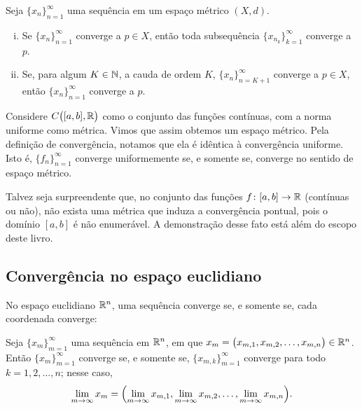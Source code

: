 \begin{prop} \label{prop:mssubseq}
Seja $\{ x_n \}_{n=1}^\infty$ uma sequência em um espaço métrico $(X,d)$.
\begin{enumerate}[(i)]
\item Se $\{ x_n \}_{n=1}^\infty$ converge a $p \in X$, então toda
subsequência $\{ x_{n_k} \}_{k=1}^\infty$
converge a $p$.
\item Se, para algum $K \in {\mathbb{N}}$, a cauda de ordem $K$,
$\{ x_n \}_{n=K+1}^\infty$
converge a $p \in X$, então
 $\{ x_n \}_{n=1}^\infty$ converge a $p$.
\end{enumerate}
\end{prop}

\begin{example}
Considere $C\bigl([a,b],{\mathbb{R}}\bigr)$ como o conjunto das funções contínuas,
com a norma uniforme como métrica. Vimos que assim obtemos um espaço métrico.
Pela definição de convergência, notamos que ela é idêntica à convergência
uniforme. Isto é, $\{ f_n \}_{n=1}^\infty$ converge uniformemente se, e
somente se, converge no sentido de espaço métrico.
\end{example}

\begin{remark}
Talvez seja surpreendente que, no conjunto das funções
$f \colon [a,b] \to {\mathbb{R}}$ (contínuas ou não), não exista uma métrica que
induza a convergência pontual, pois o domínio $[a,b]$ é não enumerável.
A demonstração desse fato está além do escopo deste livro.
\end{remark}

\subsection{Convergência no espaço euclidiano}

No espaço euclidiano ${\mathbb{R}}^n$, uma sequência converge se, e somente se,
cada coordenada converge:

\begin{prop} \label{prop:msconveuc}
Seja $\{ x_m \}_{m=1}^\infty$ uma sequência em ${\mathbb{R}}^n$,
em que $x_m = \bigl(x_{m,1},x_{m,2},\ldots,x_{m,n}\bigr) \in {\mathbb{R}}^n$.
Então $\{ x_m \}_{m=1}^\infty$ converge se, e somente se,
$\{ x_{m,k} \}_{m=1}^\infty$ converge para todo $k=1,2,\ldots,n$; nesse caso,
\begin{equation*}
\lim_{m\to\infty}
x_m =
\Bigl(
\lim_{m\to\infty} x_{m,1},
\lim_{m\to\infty} x_{m,2},
\ldots,
\lim_{m\to\infty} x_{m,n}
\Bigr) .
\end{equation*}
\end{prop}

